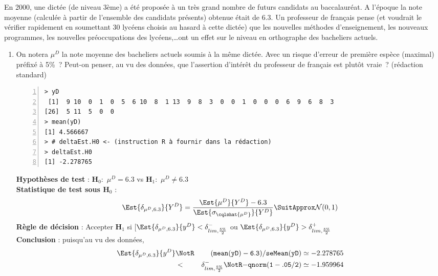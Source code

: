 \documentclass[10pt]{report}
\begin{document}
\begin{exercice}[Dictée]

En 2000, une  dictée (de niveau 3ème) a été proposée à un très grand nombre de futurs candidats au baccalauréat. A l'époque la note moyenne (calculée à partir de l'ensemble des candidats présents) obtenue était de $6.3$. Un professeur de français pense (et voudrait le vérifier rapidement en soumettant 30 lycéens choisis au hasard à cette dictée) que les nouvelles méthodes d'enseignement, les nouveaux programmes, les nouvelles préoccupations  des lycéens,\ldots ont un effet sur le niveau en orthographe des bacheliers actuels.  \\


\begin{enumerate}
\item On notera $\mu^D$ la note moyenne des bacheliers actuels soumis à la même dictée. Avec un risque d'erreur de première espèce (maximal) préfixé à 5\%~? Peut-on penser, au vu des données, que l'assertion d'intérêt du professeur de français est plutôt vraie~? (rédaction standard)

\IndicR
\begin{Verbatim}[frame=leftline,fontfamily=tt,fontshape=n,numbers=left]
> yD
 [1]  9 10  0  1  0  5  6 10  8  1 13  9  8  3  0  0  1  0  0  0  6  9  6  8  3
[26]  5 11  5  0  0
> mean(yD)
[1] 4.566667
> # deltaEst.H0 <- (instruction R à fournir dans la rédaction)
> deltaEst.H0
[1] -2.278765
\end{Verbatim}

 

\begin{Correction}

\noindent \textbf{Hypothèses de test} : $\mathbf{H}_0:$ $\mu^{D}=6.3$ vs {\large $\mathbf{H}_1:$ $\mu^{D}\neq6.3$}\\
\textbf{Statistique de test sous $\mathbf{H}_0$} :
  $$
  \Est{\delta_{\mu^{D},6.3}}{Y^{D}}= {\displaystyle \frac{\Est{\mu^{D}}{Y^{D}}-6.3}{
\Est{\sigma_{\cqlshat{\mu^{D}}}}{Y^{D}}
}} 
  \SuitApprox \mathcal{N}(0,1)
  $$
\textbf{Règle de décision} : Accepter $\mathbf{H}_1$ si 
  [$\Est{\delta_{\mu^{D},6.3}}{y^{D}} < \delta^-_{lim,\frac{5\%}{2}}$ ou $\Est{\delta_{\mu^{D},6.3}}{y^{D}} > \delta^+_{lim,\frac{5\%}{2}}$
    \\
\noindent \textbf{Conclusion} :
puisqu'au vu des données, 
  \begin{eqnarray*}
\Est{\delta_{\mu^{D},6.3}}{y^{D}} &\NotR&\mathtt{(mean(yD)-6.3)/seMean(yD)}\simeq -2.278765\\& <  & \delta^-_{lim,\frac{5\%}{2}} \NotR \mathtt{-qnorm(1-.05/2)}\simeq-1.959964
\end{eqnarray*}
  

\end{Correction}
\end{enumerate}
\end{exercice}
\end{document}
